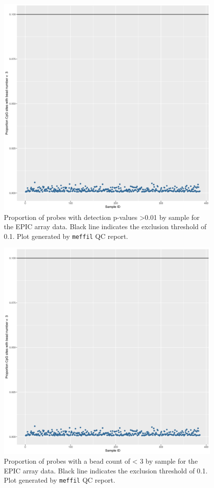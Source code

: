 \documentclass[
]{book}
\begin{document}
\begin{figure}

{\centering \includegraphics[width=0.8\linewidth]{figs/MAVIDOS-II-qcEPICpropSites} 

}

\caption{Proportion of probes with detection p-values \textgreater0.01 by sample for the EPIC array data. Black line indicates the exclusion threshold of 0.1. Plot generated by \texttt{meffil} QC report.}\label{fig:MAVIDOSIIqcEPICpropSites}
\end{figure}



\begin{figure}

{\centering \includegraphics[width=0.8\linewidth]{figs/MAVIDOS-II-qcEPICbeadNum} 

}

\caption{Proportion of probes with a bead count of \textless{} 3 by sample for the EPIC array data. Black line indicates the exclusion threshold of 0.1. Plot generated by \texttt{meffil} QC report.}\label{fig:MAVIDOSIIqcEPICbeadNum}
\end{figure}
\end{document}
